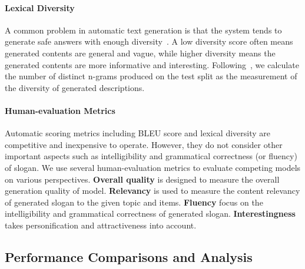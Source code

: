 \paragraph{Lexical Diversity}
A common problem in automatic text generation is that the system tends to generate safe
answers with enough diversity~\cite{li2016deep}.
A low diversity score often means generated contents are general and vague, 
while higher diversity means the generated contents are more informative and 
interesting.
Following~\cite{ChenLZYZ019}, we calculate the number of distinct n-grams produced on the test split
as the measurement of the diversity of generated descriptions.

\paragraph{Human-evaluation Metrics}
Automatic scoring metrics including BLEU score and lexical diversity are competitive and inexpensive to operate.
However, they do not consider
other important aspects such as intelligibility and grammatical correctness (or fluency) of slogan.
We use several human-evaluation metrics
to evaluate competing models on various perspectives.
\textbf{Overall quality} is designed to measure the
overall generation quality of model. \textbf{Relevancy} is used to measure the content relevancy of generated slogan to the given topic and items. \textbf{Fluency} focus on the intelligibility and grammatical correctness of generated slogan.
\textbf{Interestingness} takes personification and attractiveness into account.


\subsection{Performance Comparisons and Analysis}
\label{sec:results}


